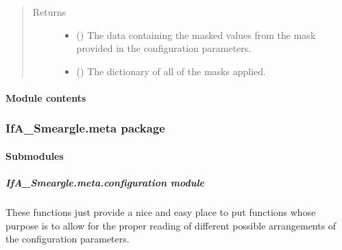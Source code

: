 \documentclass[letterpaper,10pt,english]{sphinxmanual}
\begin{document}
\begin{fulllineitems}
\begin{quote}
\begin{description}
\begin{itemize}
\end{itemize}

\item[{Returns}] \leavevmode
\begin{itemize}
\item {} 
 () \textendash{} The data containing the masked values from the mask provided in the
configuration parameters.

\item {} 
 () \textendash{} The dictionary of all of the masks applied.

\end{itemize}


\end{description}\end{quote}

\end{fulllineitems}



\paragraph{Module contents}
\label{\detokenize{python_docstrings/IfA_Smeargle.echo:module-IfA_Smeargle.echo}}\label{\detokenize{python_docstrings/IfA_Smeargle.echo:module-contents}}

\subsubsection{IfA\_Smeargle.meta package}
\label{\detokenize{python_docstrings/IfA_Smeargle.meta:ifa-smeargle-meta-package}}\label{\detokenize{python_docstrings/IfA_Smeargle.meta::doc}}

\paragraph{Submodules}
\label{\detokenize{python_docstrings/IfA_Smeargle.meta:submodules}}

\subparagraph{IfA\_Smeargle.meta.configuration module}
\label{\detokenize{python_docstrings/IfA_Smeargle.meta.configuration:module-IfA_Smeargle.meta.configuration}}\label{\detokenize{python_docstrings/IfA_Smeargle.meta.configuration:ifa-smeargle-meta-configuration-module}}\label{\detokenize{python_docstrings/IfA_Smeargle.meta.configuration::doc}}
These functions just provide a nice and easy place to put functions whose
purpose is to allow for the proper reading of different possible arrangements
of the configuration parameters.
\end{document}
